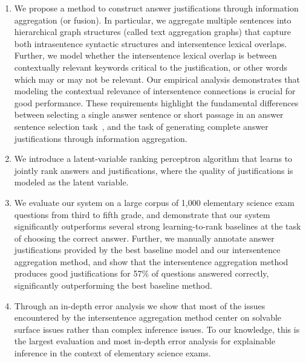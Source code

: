 \begin{enumerate}
\item We propose a method to construct answer justifications through information aggregation (or fusion). 
In particular, we aggregate multiple sentences into hierarchical graph structures (called text aggregation graphs) that capture both intrasentence syntactic structures and intersentence lexical overlaps. 
Further, we model whether the intersentence lexical overlap is between contextually relevant keywords critical to the justification, or other words which may or may not be relevant. 
Our empirical analysis demonstrates that modeling the contextual relevance of intersentence connections is crucial for good performance.  These requirements highlight the fundamental differences between selecting a single answer sentence or short passage in an answer sentence selection task~\cite[inter alia]{Severyn:12,Severyn:13a,Severyn:13b}, and the task of generating complete answer justifications through information aggregation. 


\item 
We introduce a latent-variable ranking perceptron algorithm that learns to jointly rank answers and justifications, where the quality of justifications is modeled as the latent variable. 

\item 
We evaluate our system on a large corpus of 1,000 elementary science exam questions from third to fifth grade, and demonstrate that our system significantly outperforms several strong learning-to-rank baselines at the task of choosing the correct answer.  Further, we manually annotate answer justifications provided by the best baseline model and our intersentence aggregation method, and show that the intersentence aggregation method produces good justifications for 57\% of questions answered correctly, significantly outperforming the best baseline method. 

\item Through an in-depth error analysis we show that most of the issues encountered by the intersentence aggregation method center on solvable surface issues rather than complex inference issues.  To our knowledge, this is the largest evaluation and most in-depth error analysis for explainable inference in the context of elementary science exams. 


\end{enumerate}

